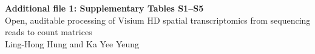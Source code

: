 \documentclass[10pt,a4paper]{article}
\begin{document}
\begin{center}
{\large\bfseries Additional file 1: Supplementary Tables S1--S5}\\[4pt]
Open, auditable processing of Visium HD spatial transcriptomics from sequencing reads to count matrices\\[2pt]
Ling-Hong Hung and Ka Yee Yeung
\end{center}

\end{document}

